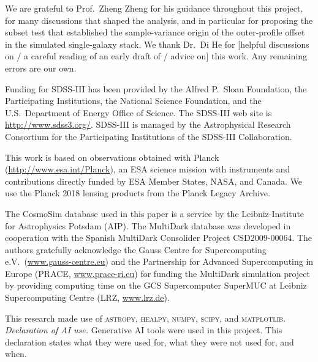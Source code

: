 
\begin{acknowledgments}
We are grateful to Prof.\ Zheng Zheng for his guidance throughout this
project, for many discussions that shaped the analysis, and in particular
for proposing the subset test that established the sample-variance origin
of the outer-profile offset in the simulated single-galaxy stack. We thank
Dr.\ Di He for [helpful discussions on / a careful reading of an early draft
of / advice on] this work. %
Any remaining errors are our own.

Funding for SDSS-III has been provided by the Alfred P.\ Sloan Foundation,
the Participating Institutions, the National Science Foundation, and the
U.S.\ Department of Energy Office of Science. The SDSS-III web site is
\url{http://www.sdss3.org/}. SDSS-III is managed by the Astrophysical
Research Consortium for the Participating Institutions of the SDSS-III
Collaboration. %

This work is based on observations obtained with Planck
(\url{http://www.esa.int/Planck}), an ESA science mission with instruments
and contributions directly funded by ESA Member States, NASA, and Canada.
We use the Planck 2018 lensing products from the Planck Legacy Archive.

The CosmoSim database used in this paper is a service by the
Leibniz-Institute for Astrophysics Potsdam (AIP). The MultiDark database
was developed in cooperation with the Spanish MultiDark Consolider Project
CSD2009-00064. The authors gratefully acknowledge the Gauss Centre for
Supercomputing e.V.\ (\url{www.gauss-centre.eu}) and the Partnership for
Advanced Supercomputing in Europe (PRACE, \url{www.prace-ri.eu}) for
funding the MultiDark simulation project by providing computing time on the
GCS Supercomputer SuperMUC at Leibniz Supercomputing Centre
(LRZ, \url{www.lrz.de}).

This research made use of \textsc{astropy}, \textsc{healpy}, \textsc{numpy},
\textsc{scipy}, and \textsc{matplotlib}. %
\emph{Declaration of AI use.} Generative AI tools were used in this project.
This declaration states what they were used for, what they were not used for,
and when.


\end{acknowledgments}
